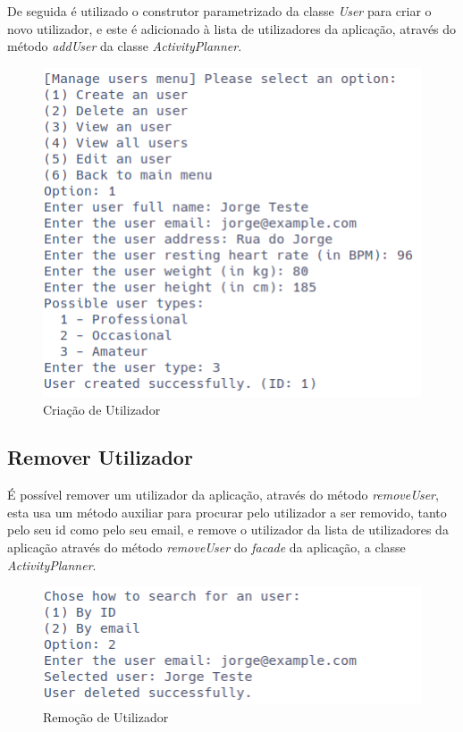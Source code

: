 \documentclass[a4paper,12pt]{scrreprt}
\begin{document}
    De seguida é utilizado o construtor parametrizado da classe \textit{User} para criar o novo utilizador,
    e este é adicionado à lista de utilizadores da aplicação,
    através do método \textit{addUser} da classe \textit{ActivityPlanner}.

    \begin{figure}[!ht]
        \centering
        \includegraphics[width=\textwidth]{images/createUser.png}
        \caption{Criação de Utilizador}
        \label{fig:create-user}
    \end{figure}

    \clearpage
    \subsection{Remover Utilizador}
    É possível remover um utilizador da aplicação, através do método \textit{removeUser},
    esta usa um método auxiliar para procurar pelo utilizador a ser removido,
    tanto pelo seu id como pelo seu email,
    e remove o utilizador da lista de utilizadores da aplicação através do método \textit{removeUser}
    do \textit{facade} da aplicação, a classe \textit{ActivityPlanner}.

    \begin{figure}[!ht]
        \centering
        \includegraphics[width=\textwidth]{images/deleteUser.png}
        \caption{Remoção de Utilizador}
        \label{fig:remove-user}
    \end{figure}
\end{document}
